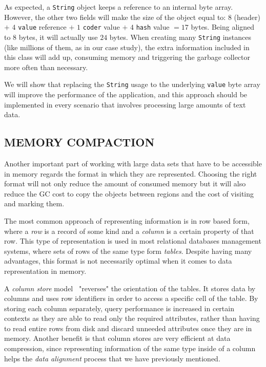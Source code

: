 \documentclass[a4paper,twoside]{article}
\begin{document}
As expected, a \texttt{String} object keeps a reference to an internal byte array.
However, the other two fields will make the size of the object equal to: $8$ (header) $+$ $4$ \texttt{value} reference $+$ $1$  \texttt{coder} value $+$ $4$ \texttt{hash} value $= 17$ bytes.
Being aligned to $8$ bytes, it will actually use $24$ bytes.
When creating many \texttt{String} instances (like millions of them, as in our case study), the extra information included in this class will add up, consuming memory and  triggering the garbage collector more often than necessary. 

We will show that replacing the \texttt{String} usage to the underlying \texttt{value} byte array will improve the performance of the application, and this approach should be implemented in every scenario that involves processing large amounts of text data.




\subsection{\uppercase{Memory Compaction}}
\label{background:compaction}

Another important part of working with large data sets that have to be accessible in memory regards the format in which they are represented.
Choosing the right format will not only reduce the amount of consumed memory but it will also reduce the GC cost to copy the objects between regions and the cost of visiting and marking them.

The most common approach of representing information is in row based form, where a {\textit{row}} is a record of some kind and a {\textit{column}} is a certain property of that row.
This type of representation is used in most relational databases management systems, where sets of rows of the same type form {\textit{tables}}.
Despite having many advantages, this format is not necessarily optimal when it comes to data representation in memory.

A {\textit{column store}} model~\cite{abadi:2013} "reverses" the orientation of the tables.
It stores data by columns and uses row identifiers in order to access a specific cell of the table.
By storing each column separately, query performance is increased in certain contexts as they are able to read only the required attributes, rather than having to read entire rows from disk and discard unneeded attributes once they are in memory.
Another benefit is that column stores are very efficient at data compression, since representing information of the same type inside of a column helps the {\textit{data alignment}} process that we have previously mentioned.
\end{document}
